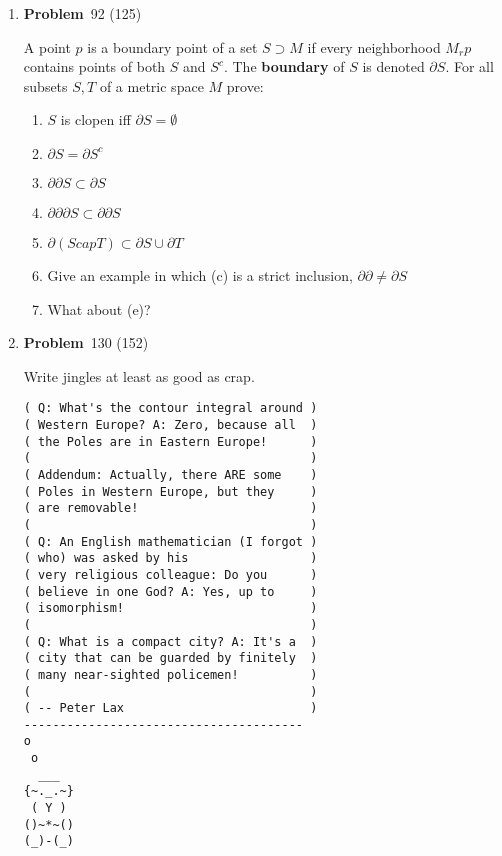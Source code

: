 \documentclass[12pt]{amsart}
\newcommand{\benu}{\begin{enumerate}}
\newcommand{\eenu}{\end{enumerate}}
\theoremstyle{definition}
\newcommand{\itep}{\item {\bfseries Problem}\ }
\begin{document}
\begin{enumerate}[series=p]
\itep 92 (125)

A point $p$ is a boundary point of a set $S \supset M$ if every neighborhood $M_rp$ contains points of both $S$ and $S^c$.  The \textbf{boundary} of $S$ is denoted $\partial S$.  For all subsets $S, T$ of a metric space $M$ prove:
	\benu
		\item $S$ is clopen iff $\partial S = \emptyset$
		\item $\partial S = \partial S^c$
		\item $\partial \partial S \subset \partial S$
		\item $\partial \partial \partial S \subset \partial \partial S$
		\item $\partial (S cap T) \subset \partial S \cup \partial T$
		\item Give an example in which (c) is a strict inclusion, $\partial \partial \neq \partial S$
		\item What about (e)?
	\eenu
\newpage


\itep 130 (152)

Write jingles at least as good as crap.
\begin{verbatim}
( Q: What's the contour integral around )
( Western Europe? A: Zero, because all  )
( the Poles are in Eastern Europe!      )
(                                       )
( Addendum: Actually, there ARE some    )
( Poles in Western Europe, but they     )
( are removable!                        )
(                                       )
( Q: An English mathematician (I forgot )
( who) was asked by his                 )
( very religious colleague: Do you      )
( believe in one God? A: Yes, up to     )
( isomorphism!                          )
(                                       )
( Q: What is a compact city? A: It's a  )
( city that can be guarded by finitely  )
( many near-sighted policemen!          )
(                                       )
( -- Peter Lax                          )
---------------------------------------
o
 o
  ___  
{~._.~}
 ( Y )
()~*~()   
(_)-(_)   
\end{verbatim}
\newpage

\end{enumerate}
\end{document}

